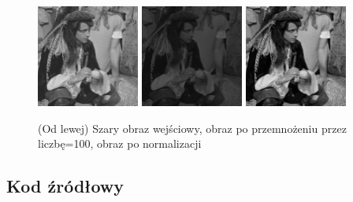 \documentclass[final,a4paper,openany,12pt]{mwbk}
\begin{document}
\begin{figure}[H]
	\begin{center}
		\includegraphics[width=0.3\textwidth]{2/2Gray_Const_Multipl_Original}
		\includegraphics[width=0.3\textwidth]{2/2Gray_Const_Multipl_Result}
		\includegraphics[width=0.3\textwidth]{2/2Gray_Const_Multipl_Result_Norm}
	\end{center}
	\caption{(Od lewej) Szary obraz wejściowy, obraz po przemnożeniu przez liczbę=100, obraz po normalizacji }
\end{figure}

\subsection*{Kod źródłowy}
\end{document}
